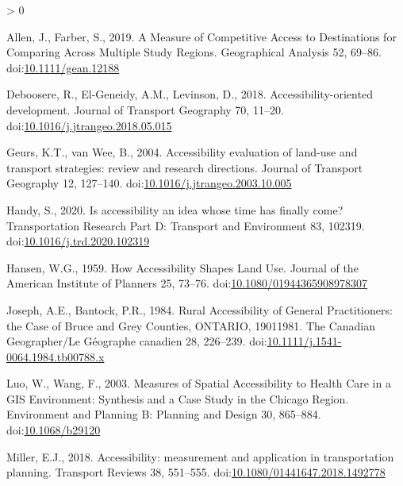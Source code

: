 \documentclass[]{elsarticle} %
\newlength{\cslhangindent}
\newenvironment{CSLReferences}[2] %
 {%
  \setlength{\parindent}{0pt}
  \ifodd #1 \everypar{\setlength{\hangindent}{\cslhangindent}}\ignorespaces\fi
  \ifnum #2 > 0
  \setlength{\parskip}{#2\baselineskip}
  \fi
 }%
 {}
\begin{document}
\hypertarget{refs}{}
\begin{CSLReferences}{1}{0}
\leavevmode\hypertarget{ref-allen2019}{}%
Allen, J., Farber, S., 2019. A Measure of Competitive Access to
Destinations for Comparing Across Multiple Study Regions. Geographical
Analysis 52, 69--86.
doi:\href{https://doi.org/10.1111/gean.12188}{10.1111/gean.12188}

\leavevmode\hypertarget{ref-deboosere2018}{}%
Deboosere, R., El-Geneidy, A.M., Levinson, D., 2018.
Accessibility-oriented development. Journal of Transport Geography 70,
11--20.
doi:\href{https://doi.org/10.1016/j.jtrangeo.2018.05.015}{10.1016/j.jtrangeo.2018.05.015}

\leavevmode\hypertarget{ref-geurs2004}{}%
Geurs, K.T., van Wee, B., 2004. Accessibility evaluation of land-use and
transport strategies: review and research directions. Journal of
Transport Geography 12, 127--140.
doi:\href{https://doi.org/10.1016/j.jtrangeo.2003.10.005}{10.1016/j.jtrangeo.2003.10.005}

\leavevmode\hypertarget{ref-handy2020}{}%
Handy, S., 2020. Is accessibility an idea whose time has finally come?
Transportation Research Part D: Transport and Environment 83, 102319.
doi:\href{https://doi.org/10.1016/j.trd.2020.102319}{10.1016/j.trd.2020.102319}

\leavevmode\hypertarget{ref-hansen1959}{}%
Hansen, W.G., 1959. How Accessibility Shapes Land Use. Journal of the
American Institute of Planners 25, 73--76.
doi:\href{https://doi.org/10.1080/01944365908978307}{10.1080/01944365908978307}

\leavevmode\hypertarget{ref-joseph1984}{}%
Joseph, A.E., Bantock, P.R., 1984. Rural Accessibility of General
Practitioners: the Case of Bruce and Grey Counties, ONTARIO,
1901{{}}1981. The Canadian Geographer/Le Géographe canadien 28,
226--239.
doi:\href{https://doi.org/10.1111/j.1541-0064.1984.tb00788.x}{10.1111/j.1541-0064.1984.tb00788.x}

\leavevmode\hypertarget{ref-luo2003}{}%
Luo, W., Wang, F., 2003. Measures of Spatial Accessibility to Health
Care in a GIS Environment: Synthesis and a Case Study in the Chicago
Region. Environment and Planning B: Planning and Design 30, 865--884.
doi:\href{https://doi.org/10.1068/b29120}{10.1068/b29120}

\leavevmode\hypertarget{ref-miller2018}{}%
Miller, E.J., 2018. Accessibility: measurement and application in
transportation planning. Transport Reviews 38, 551--555.
doi:\href{https://doi.org/10.1080/01441647.2018.1492778}{10.1080/01441647.2018.1492778}


\end{CSLReferences}
\end{document}
